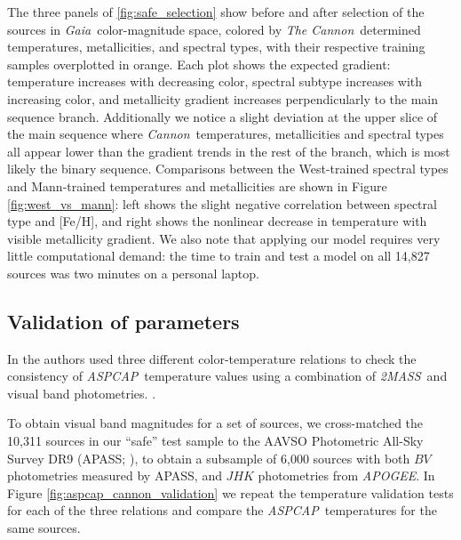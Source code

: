 \documentclass[modern]{aastex62}
\newcommand{\apogee}{\textsl{APOGEE}}
\newcommand{\thecannon}{\textsl{The Cannon}}
\newcommand{\cannon}{\textsl{Cannon}}
\newcommand{\aspcap}{\textsl{ASPCAP}}
\newcommand{\gaia}{\textsl{Gaia}}
\newcommand{\zmass}{\textsl{2MASS}}
\begin{document}
The three panels of \ref{fig:safe_selection} show before and after selection of the sources in \gaia\ color-magnitude space, colored by \thecannon\ determined temperatures, metallicities, and spectral types, with their respective training samples overplotted in orange. Each plot shows the expected gradient: temperature increases with decreasing color, spectral subtype increases with increasing color, and metallicity gradient increases perpendicularly to the main sequence branch. Additionally we notice a slight deviation at the upper slice of the main sequence where \cannon\ temperatures, metallicities and spectral types all appear lower than the gradient trends in the rest of the branch, which is most likely the binary sequence. Comparisons between the West-trained spectral types and Mann-trained temperatures and metallicities are shown in Figure \ref{fig:west_vs_mann}: left shows the slight negative correlation between spectral type and [Fe/H], and right shows the nonlinear decrease in temperature with visible metallicity gradient. We also note that applying our model requires very little computational demand: the time to train and test a model on all 14,827 sources was two minutes on a personal laptop. 

\subsection{Validation of parameters}

In \citealt{Schmidt:2016} the authors used three different color-temperature relations to check the consistency of \aspcap\ temperature values using a combination of \zmass\ and visual band photometries. \color{black}. 

To obtain visual band magnitudes for a set of sources, we cross-matched the 10,311 sources in our ``safe'' test sample to the AAVSO Photometric All-Sky Survey DR9 (APASS; \citealt{Henden:2016}), to obtain a subsample of 6,000 sources with both $BV$ photometries measured by APASS, and $JHK$ photometries from \apogee. In Figure \ref{fig:aspcap_cannon_validation} we repeat the temperature validation tests for each of the three relations and compare the \aspcap\ temperatures for the same sources. \color{gcolor}{Comments about validation results and the uncertainty of our Cannon temperatures...}\color{black}

\color{gcolor}{What are all of the parameters we want to report and what do we want to emphasize? Are there other parameters (such as mass) that might be straightforward to estimate?}\color{black}
\end{document}
